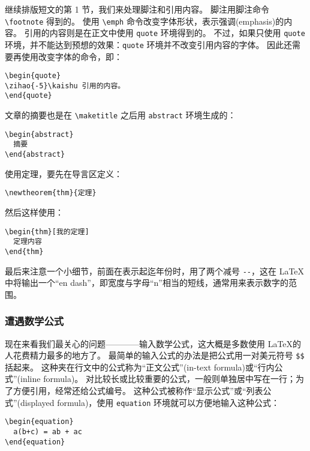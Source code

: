 \documentclass[UTF8]{ctexart} %
\newtheorem{thm}{定理}
\begin{document}
继续排版短文的第 1 节，我们来处理脚注和引用内容。
脚注用脚注命令 \verb|\footnote| 得到的。
使用 \verb|\emph| 命令改变字体形状，表示强调(emphasis)的内容。
引用的内容则是在正文中使用 \verb|quote| 环境得到的。
不过，如果只使用 \verb|quote| 环境，并不能达到预想的效果：\verb|quote| 环境并不改变引用内容的字体。
因此还需要再使用改变字体的命令，即：
\begin{verbatim}
\begin{quote}
\zihao{-5}\kaishu 引用的内容。
\end{quote}
\end{verbatim}
文章的摘要也是在 \verb|\maketitle| 之后用 \verb|abstract| 环境生成的：
\begin{verbatim}
\begin{abstract}
  摘要
\end{abstract}
\end{verbatim}

使用定理，要先在导言区定义：
\begin{verbatim}
\newtheorem{thm}{定理}
\end{verbatim}
然后这样使用：
\begin{verbatim}
\begin{thm}[我的定理]
  定理内容
\end{thm}
\end{verbatim}

最后来注意一个小细节，前面在表示起迄年份时，用了两个减号 \verb|--|，这在 \LaTeX 中将输出一个“en dash”，即宽度与字母“n”相当的短线，通常用来表示数字的范围。

\subsubsection{遭遇数学公式}
\label{subsub:遭遇数学公式}

现在来看我们最关心的问题————输入数学公式，这大概是多数使用 \LaTeX 的人花费精力最多的地方了。
最简单的输入公式的办法是把公式用一对美元符号 \verb|$$| 括起来。
这种夹在行文中的公式称为“正文公式”(in-text formula)或“行内公式”(inline formula)。
对比较长或比较重要的公式，一般则单独居中写在一行；为了方便引用，经常还给公式编号。
这种公式被称作“显示公式”或“列表公式”(displayed formula)，使用 \verb|equation| 环境就可以方便地输入这种公式：
\begin{verbatim}
\begin{equation}
  a(b+c) = ab + ac
\end{equation}
\end{verbatim}
\end{document}
